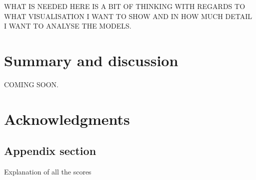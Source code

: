 \documentclass[article,shortnames]{jss}
\begin{document}
WHAT IS NEEDED HERE IS A BIT OF THINKING WITH REGARDS TO WHAT VISUALISATION I WANT TO SHOW AND IN HOW MUCH DETAIL I WANT TO ANALYSE THE MODELS. 






\section{Summary and discussion} \label{sec:summary}

COMING SOON. 




\section*{Acknowledgments}








\newpage

\begin{appendix}

\section{Appendix section} \label{app:technical}

\begin{table}[h!]
\centering
\caption{\label{tab:score-table} Explanation of all the scores}
\end{table}


\end{appendix}

\end{document}
